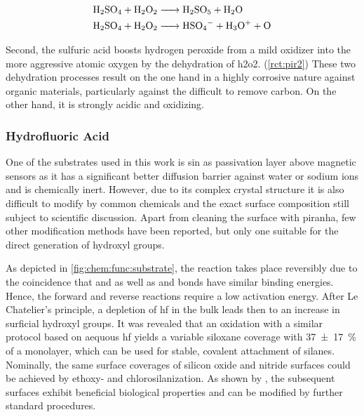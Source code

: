 \begin{align}
	\ce{H2SO4 + H2O2 &-> H2SO5 + H2O} \label{rct:pir1}\\
	\ce{H2SO4 + H2O2 &-> HSO4- + H3O+ + O} \label{rct:pir2}
\end{align}

Second, the sulfuric acid boosts hydrogen peroxide from a mild oxidizer into the more aggressive atomic oxygen by the dehydration of \gls{h2o2}. (\cref{rct:pir2})  These two dehydration processes result on the one hand in a highly corrosive nature against organic materials, particularly against the difficult to remove carbon. On the other hand, it is strongly acidic and oxidizing.

\subsubsection{Hydrofluoric Acid}

One of the substrates used in this work is \gls{sin} as passivation layer above magnetic sensors as it has a significant better diffusion barrier against water or sodium ions and is chemically inert.\cite{lit:chem:sin:surface} However, due to its complex crystal structure it is also difficult to modify by common chemicals and the exact surface composition still subject to scientific discussion.\cite{lit:chem:sin:etchingcontrol} Apart from cleaning the surface with piranha, few other modification methods have been reported, but only one suitable for the direct generation of \gls{hydroxyl} groups.\cite{lit:chem:sin:etchingcontrol, lit:chem:sin:biofunc, lit:chem:sin:langeDiss, lit:chem:sin:modforFoodapps}

As depicted in \cref{fig:chem:func:substrate}, the reaction  takes place reversibly due to the coincidence that  and  as well as  and  bonds have similar binding energies. Hence, the forward and reverse reactions require a low activation energy. After Le Chatelier's principle, a depletion of \gls{hf} in the bulk leads then to an increase in surficial hydroxyl groups.\cite{lit:chem:sin:SiFSiOH} It was revealed that an oxidation with a similar protocol based on aequous \gls{hf} yields a variable \gls{siloxane} coverage with \SI{37(17)}{\percent} of a monolayer, which can be used for stable, covalent attachment of silanes. Nominally, the same surface coverages of silicon oxide and nitride surfaces could be achieved by ethoxy- and chlorosilanization.\cite{lit:chem:sin:surfacEtchingandMod} As shown by \citet{lit:chem:sin:silane}, the subsequent surfaces exhibit beneficial biological properties and can be modified by further standard procedures.


